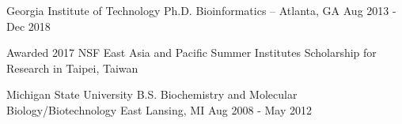 \vspace{1.0mm}

\begin{cventries}

  \cventry
  	{Georgia Institute of Technology} %
    {Ph.D. Bioinformatics \scriptsize{} \enspace -- } %
    {Atlanta, GA} %
    {Aug 2013 - Dec 2018} %
    {\begin{cvitems}
    \item \scriptsize{Awarded 2017 NSF East Asia and Pacific Summer Institutes Scholarship for Research in Taipei, Taiwan}
    \end{cvitems}
    }


  \cventry
  	{Michigan State University} %
    {B.S. Biochemistry and Molecular Biology/Biotechnology \scriptsize{}} %
    {East Lansing, MI} %
    {Aug 2008 - May 2012} %
    {}
	
\vspace{-2em}

\end{cventries}

